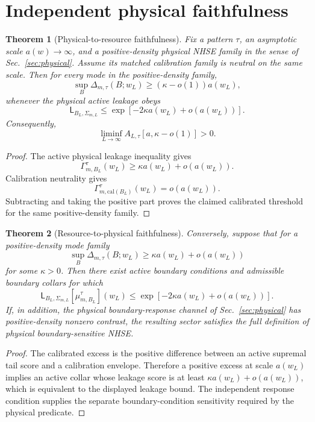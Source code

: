 \documentclass[11pt]{article}
\newtheorem{theorem}{Theorem}
\begin{document}
\section{Independent physical faithfulness}
\label{sec:faithfulness}

\begin{theorem}[Physical-to-resource faithfulness]
Fix a pattern \(\tau\), an asymptotic scale \(a(w)\to\infty\), and a positive-density physical NHSE family in the sense of Sec.~\ref{sec:physical}. Assume its matched calibration family is neutral on the same scale. Then for every mode in the positive-density family,
\[
\sup_B\Delta_{m,\tau}(B;w_L)
\ge
(\kappa-o(1))a(w_L),
\]
whenever the physical active leakage obeys
\[
\mathsf L_{B_L,\Sigma_{m,L}}
\le
\exp[-2\kappa a(w_L)+o(a(w_L))].
\]
Consequently,
\[
\liminf_{L\to\infty}
A_{L,\tau}[a,\kappa-o(1)]>0.
\]
\end{theorem}

\begin{proof}
The active physical leakage inequality gives
\[
\Gamma_{m,B_L}^{\tau}(w_L)
\ge
\kappa a(w_L)+o(a(w_L)).
\]
Calibration neutrality gives
\[
\Gamma_{m,\mathrm{cal}(B_L)}^{\tau}(w_L)
=o(a(w_L)).
\]
Subtracting and taking the positive part proves the claimed calibrated threshold for the same positive-density family.
\end{proof}

\begin{theorem}[Resource-to-physical faithfulness]
Conversely, suppose that for a positive-density mode family
\[
\sup_B\Delta_{m,\tau}(B;w_L)
\ge
\kappa a(w_L)+o(a(w_L))
\]
for some \(\kappa>0\). Then there exist active boundary conditions and admissible boundary collars for which
\[
\mathsf L_{B_L,\Sigma_{m,L}}[\mu_{m,B_L}^{\tau}](w_L)
\le
\exp[-2\kappa a(w_L)+o(a(w_L))].
\]
If, in addition, the physical boundary-response channel of Sec.~\ref{sec:physical} has positive-density nonzero contrast, the resulting sector satisfies the full definition of physical boundary-sensitive NHSE.
\end{theorem}

\begin{proof}
The calibrated excess is the positive difference between an active supremal tail score and a calibration envelope. Therefore a positive excess at scale \(a(w_L)\) implies an active collar whose leakage score is at least \(\kappa a(w_L)+o(a(w_L))\), which is equivalent to the displayed leakage bound. The independent response condition supplies the separate boundary-condition sensitivity required by the physical predicate.
\end{proof}
\end{document}

